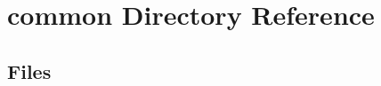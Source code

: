 \section{common Directory Reference}
\label{dir_bdd9a5d540de89e9fe90efdfc6973a4f}
\subsection*{Files}
\begin{DoxyCompactItemize}
\end{DoxyCompactItemize}
